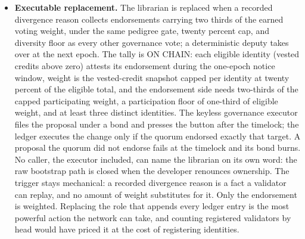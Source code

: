 \documentclass[11pt]{article}
\begin{document}
\begin{itemize}
          Two further rules keep the queue from becoming a weapon. The
          librarian owes at most a registered number of incorporations per
          epoch; a backlog beyond that rolls forward, and every entry still
          carries a deadline fixed and computable at the moment it is posted.
          And incorporation runs in posting order, so nobody can serve a
          friend ahead of a rival. Ordering the queue is also what keeps the
          validity check cheap: a validator reads the oldest open entry and
          nothing else, so an attacker cannot make the question itself
          expensive to ask. The contract records who incorporated each entry,
          which is a sharper statistic than a missed deadline: an entry a
          stranger had to clear is direct evidence about the librarian.
    \item \textbf{Executable replacement.} The librarian is
          replaced when a recorded divergence reason collects endorsements
          carrying two thirds of the earned voting weight, under the same
          pedigree gate, twenty percent cap, and diversity floor as every
          other governance vote; a deterministic deputy takes over at the
          next epoch. The tally is ON CHAIN: each eligible identity
          (vested credits above zero) attests its endorsement during the
          one-epoch notice window, weight is the vested-credit snapshot
          capped per identity at twenty percent of the eligible total, and
          the endorsement side needs two-thirds of the capped participating
          weight, a participation floor of one-third of eligible weight, and
          at least three distinct identities. The keyless governance
          executor files the proposal under a bond and presses the button
          after the timelock; the ledger executes the change only if the
          quorum endorsed exactly that target. A proposal the quorum did not
          endorse fails at the timelock and its bond burns. No caller, the
          executor included, can name the librarian on its own word: the raw
          bootstrap path is closed when the developer renounces
          ownership. The trigger stays mechanical: a recorded divergence
          reason is a fact a validator can replay, and no amount of weight
          substitutes for it. Only the endorsement is weighted. Replacing the
          role that appends every ledger entry is the most powerful action
          the network can take, and counting registered validators by head
          would have priced it at the cost of registering identities.


\end{itemize}
\end{document}
